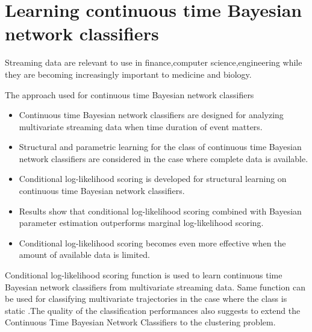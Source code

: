 \section{Learning continuous time Bayesian network classifiers}
Streaming data are relevant to use in finance,computer science,engineering while  they are becoming increasingly important to medicine and biology.


 The approach used for continuous time Bayesian network classifiers
  \begin{itemize}
    \item Continuous time Bayesian network classifiers are designed for analyzing multivariate streaming data when time duration of event matters.
    \item Structural and parametric learning for the class of continuous time  Bayesian network  classifiers are  considered  in  the  case where  complete  data is available.
    \item Conditional log-likelihood  scoring is developed for structural learning on continuous time Bayesian network classifiers.
   \item Results show that conditional  log-likelihood  scoring combined with Bayesian parameter estimation outperforms marginal log-likelihood scoring.
   \item Conditional log-likelihood  scoring becomes even more effective when  the amount of available data is limited.
\end{itemize}

Conditional log-likelihood scoring function is used  to learn continuous time Bayesian network classifiers from multivariate streaming  data.
Same function can be used for classifying multivariate trajectories in the case where the class is static .The quality of the classification performances also suggests to extend the Continuous Time Bayesian Network Classifiers to the clustering problem.


















